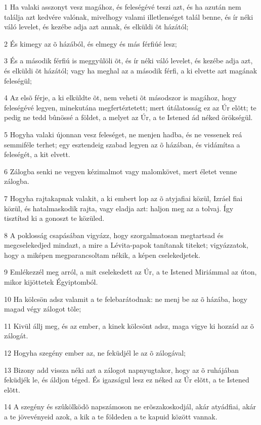 \par 1 Ha valaki asszonyt vesz magához, és feleségévé teszi azt, és ha azután nem találja azt kedvére valónak, mivelhogy valami illetlenséget talál benne, és ír néki váló levelet, és kezébe adja azt annak, és elküldi õt házától;
\par 2 És kimegy az õ házából, és elmegy és más férfiúé lesz;
\par 3 És a második férfiú is meggyûlöli õt, és ír néki váló levelet, és kezébe adja azt, és elküldi õt házától; vagy ha meghal az a második férfi, a ki elvette azt magának feleségül;
\par 4 Az elsõ férje, a ki elküldte õt, nem veheti õt másodszor is magához, hogy feleségévé legyen, minekutána megfertéztetett; mert útálatosság ez az Úr elõtt; te pedig ne tedd bûnössé a földet, a melyet az Úr, a te Istened ád néked örökségül.
\par 5 Hogyha valaki újonnan vesz feleséget, ne menjen hadba, és ne vessenek reá semmiféle terhet; egy esztendeig szabad legyen az õ házában, és vidámítsa a feleségét, a kit elvett.
\par 6 Zálogba senki ne vegyen kézimalmot vagy malomkövet, mert életet venne zálogba.
\par 7 Hogyha rajtakapnak valakit, a ki embert lop az õ atyjafiai közül, Izráel fiai közül, és hatalmaskodik rajta, vagy eladja azt: haljon meg az a tolvaj. Így tisztítsd ki a gonoszt te közüled.
\par 8 A poklosság csapásában vigyázz, hogy szorgalmatosan megtartsad és megcselekedjed mindazt, a mire a Lévita-papok tanítanak titeket; vigyázzatok, hogy a miképen megparancsoltam nékik, a képen cselekedjetek.
\par 9 Emlékezzél meg arról, a mit cselekedett az Úr, a te Istened Miriámmal az úton, mikor kijöttetek Égyiptomból.
\par 10 Ha kölcsön adsz valamit a te felebarátodnak: ne menj be az õ házába, hogy magad végy zálogot tõle;
\par 11 Kivül állj meg, és az ember, a kinek kölcsönt adsz, maga vigye ki hozzád az õ zálogát.
\par 12 Hogyha szegény ember az, ne feküdjél le az õ zálogával;
\par 13 Bizony add vissza néki azt a zálogot napnyugtakor, hogy az  õ ruhájában feküdjék le, és áldjon téged. És igazságul lesz ez néked az Úr elõtt, a te Istened elõtt.
\par 14 A szegény és szûkölködõ napszámoson ne erõszakoskodjál, akár atyádfiai, akár a te jövevényeid azok, a kik a te földeden a te kapuid között vannak.
